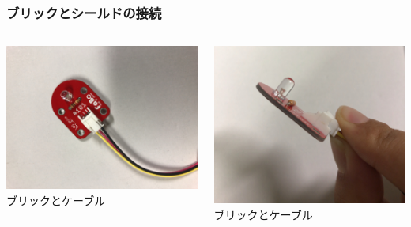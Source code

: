 \begin{frame}
    \frametitle{ブリックとシールドの接続} 
    \begin{columns}
        \begin{column}{0.48\textwidth}
            \includegraphics[width=\textwidth]{images/chap05/text05-img008.jpg} 
            {ブリックとケーブル}
        \end{column}
        \begin{column}{0.48\textwidth}
            \includegraphics[width=\textwidth]{images/chap05/text05-img011.jpg} 
            {ブリックとケーブル}
        \end{column}
    \end{columns}
\end{frame}

